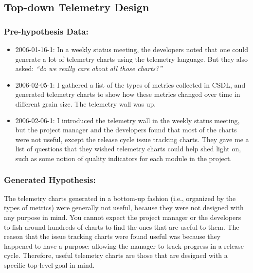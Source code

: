 \clearpage
\subsection{Top-down Telemetry Design}
\label{EvaluationInCSDL:EventsDescription:TopDownDesign}

\subsubsection{Pre-hypothesis Data:}
\begin{itemize}
  \setlength{\itemsep}{0pt}
  \setlength{\parskip}{0pt}
  \item 2006-01-16-1: In a weekly status meeting, the developers noted that one could generate a lot of telemetry charts using the telemetry language. But they also asked: \textit{``do we really care about all those charts?''}
	\item 2006-02-05-1: I gathered a list of the types of metrics collected in CSDL, and generated telemetry charts to show how these metrics changed over time in different grain size. The telemetry wall was up.
	\item 2006-02-06-1: I introduced the telemetry wall in the weekly status meeting, but the project manager and the developers found that most of the charts were not useful, except the release cycle issue tracking charts. They gave me a list of questions that they wished telemetry charts could help shed light on, such as some notion of quality indicators for each module in the project.
\end{itemize}

\subsubsection{Generated Hypothesis:}
The telemetry charts generated in a bottom-up fashion (i.e., organized by the types of metrics) were generally not useful, because they were not designed with any purpose in mind. You cannot expect the project manager or the developers to fish around hundreds of charts to find the ones that are useful to them. The reason that the issue tracking charts were found useful was because they happened to have a purpose: allowing the manager to track progress in a release cycle. Therefore, useful telemetry charts are those that are designed with a specific top-level goal in mind.

